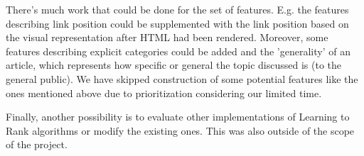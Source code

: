 There's much work that could be done for the set of features. E.g. the features describing link position could be supplemented with the link position based on the visual representation after HTML had been rendered. Moreover, some features describing explicit categories could be added and the 'generality' of an article, which represents how specific or general the topic discussed is (to the general public). We have skipped construction of some potential features like the ones mentioned above due to prioritization considering our limited time.

Finally, another possibility is to evaluate other implementations of Learning to Rank algorithms or modify the existing ones. This was also outside of the scope of the project. 